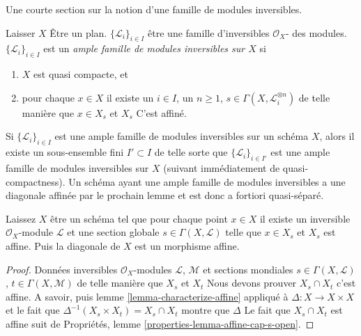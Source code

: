 \noindent
Une courte section sur la notion d'une famille de modules inversibles.

\begin{definition}

\label{definition-family-ample-invertible-modules}

\begin{reference}

\cite[II définition 2.2.4]{SGA6}

\end{reference}

Laisser $X$ Être un plan. $\{\mathcal{L}_i\}_{i \in I}$
être une famille d'inversibles $\mathcal{O}_X$- des modules.
$\{\mathcal{L}_i\}_{i \in I}$ est un {\it ample famille de modules inversibles sur $X$} si \begin{enumerate}

\item  $X$ est quasi compacte, et
\item pour chaque $x \in X$ il existe un $i \in I$, un $n \geq 1$, $s \in \Gamma(X, \mathcal{L}_i^{\otimes n})$ de telle manière que $x \in X_s$ et $X_s$ C'est affiné.

\end{enumerate}

\end{definition}

\noindent
Si $\{\mathcal{L}_i\}_{i \in I}$ est une ample famille de modules inversibles sur un schéma $X$, alors il existe un sous-ensemble fini $I' \subset I$ de telle sorte que $\{\mathcal{L}_i\}_{i \in I'}$ est une ample famille de modules inversibles sur $X$ (suivant immédiatement de quasi-compactness). Un schéma ayant une ample famille de modules inversibles a une diagonale affinée par le prochain lemme et est donc a fortiori quasi-séparé.

\begin{lemma}

\label{lemma-affine-diagonal}
Laissez $X$ être un schéma tel que pour chaque point $x \in X$ il existe un inversible $\mathcal{O}_X$-module $\mathcal{L}$ et une section globale $s \in \Gamma(X, \mathcal{L})$ telle que $x \in X_s$ et $X_s$ est affine. Puis la diagonale de $X$ est un morphisme affine.
\end{lemma}

\begin{proof}

Données inversibles $\mathcal{O}_X$-modules $\mathcal{L}$, $\mathcal{M}$
et sections mondiales $s \in \Gamma(X, \mathcal{L})$,
$t \in \Gamma(X, \mathcal{M})$ de telle manière que $X_s$ et $X_t$ Nous devons prouver $X_s \cap X_t$ c'est affine. A savoir, puis lemme \ref{lemma-characterize-affine}
appliqué à $\Delta : X \to X \times X$ et le fait que
$\Delta^{-1}(X_s \times X_t) = X_s \cap X_t$ montre que $\Delta$
Le fait que $X_s \cap X_t$ est affine suit de Propriétés, lemme \ref{properties-lemma-affine-cap-s-open}.

\end{proof}

